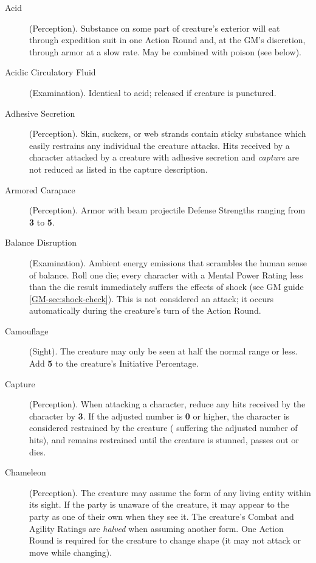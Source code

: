 \begin{description}
\item[Acid] (Perception). Substance on some part of creature's
  exterior will eat through expedition suit in one Action Round and, at
  the GM's discretion, through armor at a slow rate. May be combined
  with poison (see below).

\item[Acidic Circulatory Fluid] (Examination). Identical to acid;
  released if creature is punctured.

\item[Adhesive Secretion] (Perception). Skin, suckers, or web
  strands contain sticky substance which easily restrains any individual
  the creature attacks. Hits received by a character attacked by a
  creature with adhesive secretion and \emph{capture} are not reduced as
  listed in the capture description.

\item[Armored Carapace] (Perception). Armor with beam projectile
  Defense Strengths ranging from \textbf{3} to \textbf{5}.

\item[Balance Disruption] (Examination). Ambient energy emissions
  that scrambles the human sense of balance. Roll one die; every
  character with a Mental Power Rating less than the die result
  immediately suffers the effects of shock (see GM guide
  \ref{GM-sec:shock-check}). This is not considered an attack; it occurs
  automatically during the creature's turn of the Action Round.

\item[Camouflage] (Sight). The creature may only be seen at half the
  normal range or less. Add \textbf{5} to the creature's Initiative Percentage.

\item[Capture] (Perception). When attacking a character, reduce any
  hits received by the character by \textbf{3}. If the adjusted number
  is \textbf{0} or higher, the character is considered restrained by the
  creature ( suffering the adjusted number of hits), and remains
  restrained until the creature is stunned, passes out or dies.

\item[Chameleon] (Perception). The creature may assume the form of
  any living entity within its sight. If the party is unaware of the
  creature, it may appear to the party as one of their own when they see
  it. The creature's Combat and Agility Ratings are \emph{halved} when
  assuming another form. One Action Round is required for the creature
  to change shape (it may not attack or move while changing).
  

\end{description}
